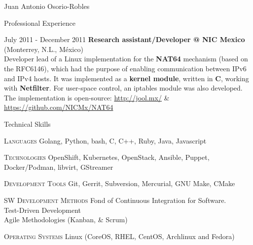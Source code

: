 \documentclass[english,10pt,letterpaper]{article}
\begin{document}
\begin{cv}{Juan Antonio Osorio-Robles}
\begin{cvlist}{Professional Experience}
		\item [July 2011 - December 2011]
            \textbf{Research assistant/Developer @ NIC Mexico} (Monterrey,
            N.L., M\'{e}xico)\\
            Developer lead of a Linux implementation for the \textbf{NAT64}
            mechanism (based on the RFC6146), which had the purpose of
            enabling communication between IPv6 and IPv4 hosts. It was
            implemented as a \textbf{kernel module}, written in \textbf{C},
            working with \textbf{Netfilter}. For user-space control, an
            iptables module was also developed. The implementation is
            open-source:
            \url{http://jool.mx/} \&\\
            \url{https://github.com/NICMx/NAT64}

	\end{cvlist}


	\begin{cvlist}{Technical Skills}
			\item [\textsc{Languages}]
                Golang, Python, bash, C, C++, Ruby, Java, Javascript
			\item [\textsc{Technologies}]
                OpenShift, Kubernetes, OpenStack, Ansible, Puppet,
                Docker/Podman, libvirt, GStreamer
			\item [\textsc{Development Tools}]
                Git, Gerrit, Subversion, Mercurial, GNU Make, CMake
			\item [\textsc{SW Development Methods}]
				Fond of Continuous Integration for Software.\\
                Test-Driven Development\\
                Agile Methodologies (Kanban, \& Scrum)
			\item [\textsc{Operating Systems}]
                Linux (CoreOS, RHEL, CentOS, Archlinux and Fedora)
	\end{cvlist}


\end{cv}
\end{document}
